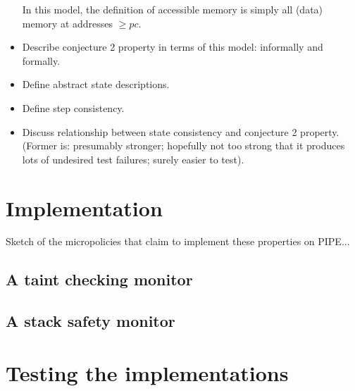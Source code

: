 \documentclass[conference]{IEEEtran}
\newif\iftext \textfalse
\begin{document}
\begin{itemize}
\begin {itemize}
  \end {itemize}
  In this model, the definition of accessible memory is simply all (data) memory at addresses $\geq pc$.
\item
  Describe conjecture 2 property in terms of this model: informally and formally.
\item
  Define abstract state descriptions.
\item
  Define step consistency.
\item
  Discuss relationship between state consistency and conjecture 2 property.  (Former is: presumably stronger; hopefully not
  too strong that it produces lots of undesired test failures; surely easier to test).

\end{itemize}







\iftext
\section{Stack + heap protection too}

POTENTIALLY: Memory safety (before stack) + Conjunction of memory + stack
safety (after).

(Memory safety by itself is just arthur’s paper, but it’s cool to see how
they are combined, especially what bits can be factored out as common
structure, e.g. the notion of accessibility)
\fi

\section{Implementation}
\label{impl}

Sketch of the micropolicies that claim to implement these properties on
PIPE...

\subsection{A taint checking monitor}

\subsection{A stack safety monitor}

\section{Testing the implementations}
\end{document}
